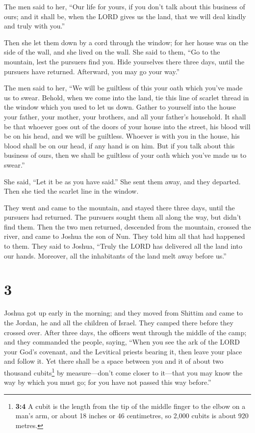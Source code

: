  The men said to her, ``Our life for yours, if you don't
talk about this business of ours; and it shall be, when the LORD gives
us the land, that we will deal kindly and truly with you.''

 Then she let them down by a cord through the window; for
her house was on the side of the wall, and she lived on the wall.
 She said to them, ``Go to the mountain, lest the
pursuers find you. Hide yourselves there three days, until the pursuers
have returned. Afterward, you may go your way.''

 The men said to her, ``We will be guiltless of this your
oath which you've made us to swear.  Behold, when we come
into the land, tie this line of scarlet thread in the window which you
used to let us down. Gather to yourself into the house your father, your
mother, your brothers, and all your father's household. 
It shall be that whoever goes out of the doors of your house into the
street, his blood will be on his head, and we will be guiltless. Whoever
is with you in the house, his blood shall be on our head, if any hand is
on him.  But if you talk about this business of ours,
then we shall be guiltless of your oath which you've made us to swear.''

 She said, ``Let it be as you have said.'' She sent them
away, and they departed. Then she tied the scarlet line in the window.

 They went and came to the mountain, and stayed there
three days, until the pursuers had returned. The pursuers sought them
all along the way, but didn't find them.  Then the two
men returned, descended from the mountain, crossed the river, and came
to Joshua the son of Nun. They told him all that had happened to them.
 They said to Joshua, ``Truly the LORD has delivered all
the land into our hands. Moreover, all the inhabitants of the land melt
away before us.''

\hypertarget{section-2}{%
\section{3}\label{section-2}}

 Joshua got up early in the morning; and they moved from
Shittim and came to the Jordan, he and all the children of Israel. They
camped there before they crossed over.  After three days,
the officers went through the middle of the camp;  and
they commanded the people, saying, ``When you see the ark of the LORD
your God's covenant, and the Levitical priests bearing it, then leave
your place and follow it.  Yet there shall be a space
between you and it of about two thousand cubits\footnote{\textbf{3:4} A
  cubit is the length from the tip of the middle finger to the elbow on
  a man's arm, or about 18 inches or 46 centimetres, so 2,000 cubits is
  about 920 metres.} by measure---don't come closer to it---that you may
know the way by which you must go; for you have not passed this way
before.''

